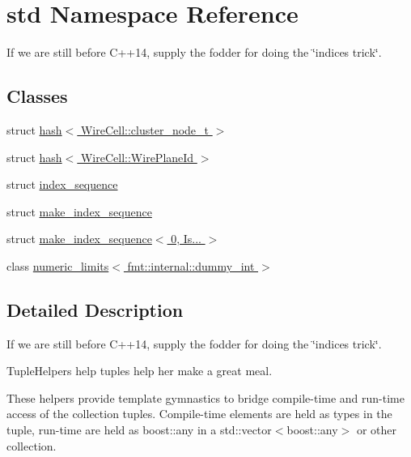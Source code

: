 \hypertarget{namespacestd}{}\section{std Namespace Reference}
\label{namespacestd}


If we are still before C++14, supply the fodder for doing the \char`\"{}indices trick\char`\"{}.  


\subsection*{Classes}
\begin{DoxyCompactItemize}
\item 
struct \hyperlink{structstd_1_1hash_3_01_wire_cell_1_1cluster__node__t_01_4}{hash$<$ Wire\+Cell\+::cluster\+\_\+node\+\_\+t $>$}
\item 
struct \hyperlink{structstd_1_1hash_3_01_wire_cell_1_1_wire_plane_id_01_4}{hash$<$ Wire\+Cell\+::\+Wire\+Plane\+Id $>$}
\item 
struct \hyperlink{structstd_1_1index__sequence}{index\+\_\+sequence}
\item 
struct \hyperlink{structstd_1_1make__index__sequence}{make\+\_\+index\+\_\+sequence}
\item 
struct \hyperlink{structstd_1_1make__index__sequence_3_010_00_01_is_8_8_8_01_4}{make\+\_\+index\+\_\+sequence$<$ 0, Is... $>$}
\item 
class \hyperlink{classstd_1_1numeric__limits_3_01fmt_1_1internal_1_1dummy__int_01_4}{numeric\+\_\+limits$<$ fmt\+::internal\+::dummy\+\_\+int $>$}
\end{DoxyCompactItemize}


\subsection{Detailed Description}
If we are still before C++14, supply the fodder for doing the \char`\"{}indices trick\char`\"{}. 

Tuple\+Helpers help tuples help her make a great meal.

These helpers provide template gymnastics to bridge compile-\/time and run-\/time access of the collection tuple\textquotesingle{}s. Compile-\/time elements are held as types in the tuple, run-\/time are held as boost\+::any in a std\+::vector$<$boost\+::any$>$ or other collection. 